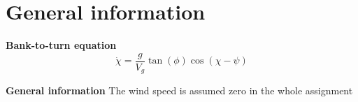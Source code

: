 \section*{General information}

\textbf{Bank-to-turn equation}
\begin{equation}\label{eq:bank-to-turn}
    \dot{\chi} = \frac{g}{V_g}\tan(\phi)\cos(\chi-\psi)
\end{equation}

\textbf{General information}
The wind speed is assumed zero in the whole assignment